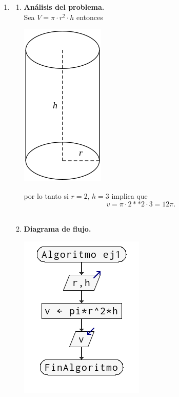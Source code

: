 
\begin{enumerate}

\item 
\begin{enumerate}[\bfseries a)]
    
    \item \textbf{Análisis del problema.}\\

    Sea $V = \pi \cdot r^2 \cdot h$ entonces 
	\begin{center}
	    \includegraphics[scale=0.5]{imagenes/tarea2/cilindro.png} \\
	\end{center}

    por lo tanto si $r=2$, $h=3$ implica que $$v=\pi\cdot 2**2\cdot 3 = 12\pi.$$\\

    \item \textbf{Diagrama de flujo.}\\
	\begin{center}
	    \includegraphics[scale=.9]{imagenes/tarea2/ej1df.png}
	\end{center}


\end{enumerate}
\end{enumerate}

